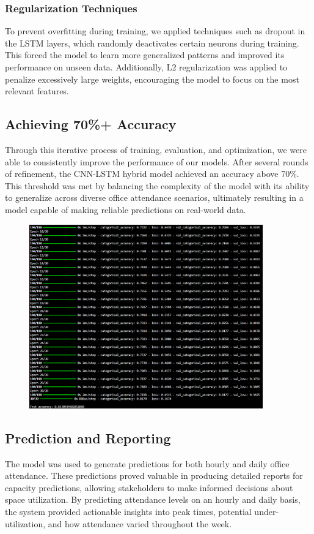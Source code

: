 \documentclass[11pt,a4paper]{article}
\begin{document}
\subsubsection*{Regularization Techniques}
To prevent overfitting during training, we applied techniques such as dropout in the LSTM layers, which randomly deactivates certain neurons during training. 
This forced the model to learn more generalized patterns and improved its performance on unseen data. 
Additionally, L2 regularization was applied to penalize excessively large weights, encouraging the model to focus on the most relevant features.

\subsection*{Achieving 70\%+ Accuracy}
Through this iterative process of training, evaluation, and optimization, we were able to consistently improve the performance of our models. 
After several rounds of refinement, the CNN-LSTM hybrid model achieved an accuracy above 70\%. 
This threshold was met by balancing the complexity of the model with its ability to generalize across diverse office attendance scenarios, 
ultimately resulting in a model capable of making reliable predictions on real-world data.

\begin{figure}[htbp]
    \centering
    \includegraphics[width=0.9\textwidth]{Training.png}
\end{figure}

\subsection*{Prediction and Reporting}
The model was used to generate predictions for both hourly and daily office attendance. 
These predictions proved valuable in producing detailed reports for capacity predictions, allowing stakeholders to make informed decisions about space utilization. 
By predicting attendance levels on an hourly and daily basis, the system provided actionable insights into peak times, potential under-utilization, and how attendance varied throughout the week.
\end{document}

